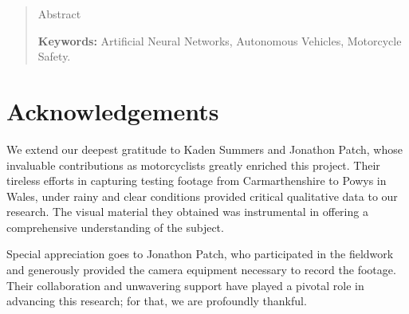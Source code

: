 \documentclass[12pt]{report} %
\begin{document}
\renewcommand\abstractname{\large\bfseries\filcenter\uppercase{Summary}}
\begin{abstract}
	\thispagestyle{plain}
	\setcounter{page}{3}

	Abstract

	\textbf{Keywords:} %
	Artificial Neural Networks, Autonomous Vehicles, Motorcycle Safety.
	\vfill
\end{abstract}
\newpage %
\thispagestyle{empty}
\mbox{}
\chapter*{Acknowledgements}
	We extend our deepest gratitude to Kaden Summers and Jonathon Patch, whose invaluable contributions as motorcyclists greatly enriched this project. Their tireless efforts in capturing testing footage from Carmarthenshire to Powys in Wales, under rainy and clear conditions provided critical qualitative data to our research. The visual material they obtained was instrumental in offering a comprehensive understanding of the subject.
	
	Special appreciation goes to Jonathon Patch, who participated in the fieldwork and generously provided the camera equipment necessary to record the footage. Their collaboration and unwavering support have played a pivotal role in advancing this research; for that, we are profoundly thankful.

\setcounter{page}{5}

\vfill

\newpage %
\thispagestyle{empty}
\mbox{}



\tableofcontents
\thispagestyle{fancy}

\newpage %
\thispagestyle{empty}
\mbox{}

\listoffigures
\thispagestyle{fancy}

\newpage %
\thispagestyle{empty}
\mbox{}

\listoftables
\thispagestyle{fancy}

\newpage %
\thispagestyle{empty}
\mbox{}


\clearpage
{} %
\end{document}
